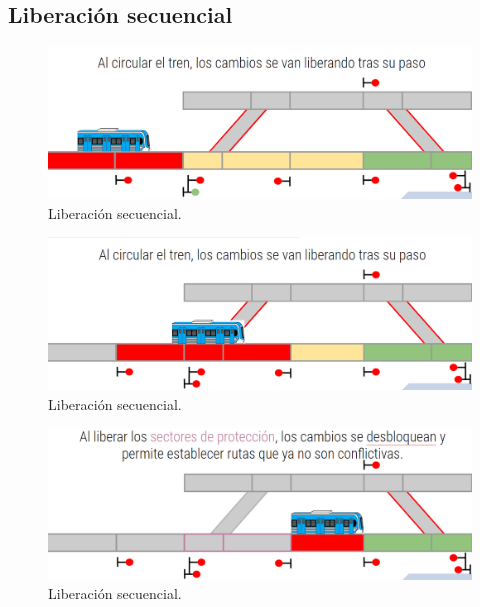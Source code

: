 \subsection{Liberación secuencial}

\lipsum[1]

    \begin{figure}[!h]
        \centering
        \includegraphics[width=1\textwidth]{Figuras/secuencial_1}
        \centering\caption{Liberación secuencial.}
        \label{fig:secuencial_1}
    \end{figure}
    
\lipsum[1]

    \begin{figure}[!h]
        \centering
        \includegraphics[width=1\textwidth]{Figuras/secuencial_2}
        \centering\caption{Liberación secuencial.}
        \label{fig:secuencial_2}
    \end{figure}
    
\lipsum[1]

    \begin{figure}[!h]
        \centering
        \includegraphics[width=1\textwidth]{Figuras/secuencial_3}
        \centering\caption{Liberación secuencial.}
        \label{fig:secuencial_3}
    \end{figure}
    
